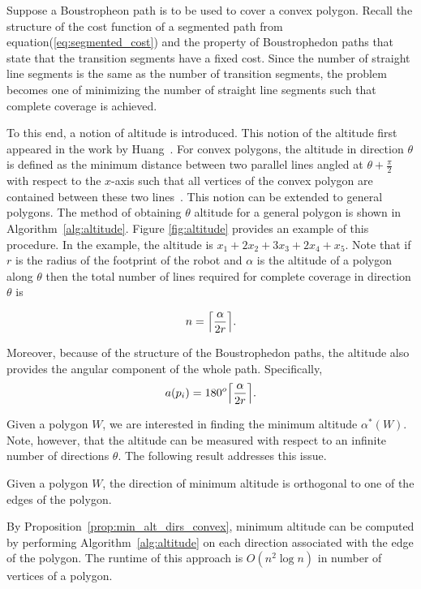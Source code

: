 \documentclass[../main.tex]{subfiles}
\begin{document}
Suppose a Boustropheon path is to be used to cover a convex polygon. Recall the structure of the cost function of a segmented path from equation(\ref{eq:segmented_cost}) and the property of Boustrophedon paths that state that the transition segments have a fixed cost. Since the number of straight line segments is the same as the number of transition segments, the problem becomes one of minimizing the number of straight line segments such that complete coverage is achieved.

To this end, a notion of altitude is introduced. This notion of the altitude first appeared in the work by Huang~\cite{Huang2001optimal}. For convex polygons, the altitude in direction $\theta$ is defined as the minimum distance between two parallel lines angled at $\theta+\frac{\pi}{2}$ with respect to the $x$-axis such that all vertices of the convex polygon are contained between these two lines~\cite{Huang2001optimal}. This notion can be extended to general polygons. The method of obtaining $\theta$ altitude for a general polygon is shown in Algorithm~\ref{alg:altitude}. Figure \ref{fig:altitude} provides an example of this procedure. In the example, the altitude is $x_1 + 2x_2 + 3x_3 + 2x_4 + x_5$. Note that if $r$ is the radius of the footprint of the robot and $\alpha$ is the altitude of a polygon along $\theta$ then the total number of lines required for complete coverage in direction $\theta$ is

\begin{equation}
	n=\ceil*{\frac{\alpha}{2r}}.
\end{equation}

Moreover, because of the structure of the Boustrophedon paths, the altitude also provides the angular component of the whole path. Specifically, 
\begin{equation}
	a(p_i)=180^o\ceil*{\frac{\alpha}{2r}}.
\end{equation}

Given a polygon $W$, we are interested in finding the minimum altitude $\alpha^*(W)$.  Note, however, that the altitude can be measured with respect to an infinite number of directions $\theta$. The following result addresses this issue.
\begin{proposition}
\label{prop:min_alt_dirs_convex}
Given a polygon $W$, the direction of minimum altitude is orthogonal to one of the edges of the polygon. 
\end{proposition}
By Proposition~\ref{prop:min_alt_dirs_convex}, minimum altitude can be computed by performing Algorithm~\ref{alg:altitude} on each direction associated with the edge of the polygon. The runtime of this approach is $O(n^2\log n)$ in number of vertices of a polygon.
\end{document}

